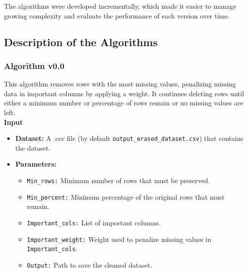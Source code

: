 \documentclass[a4paper,12pt]{article}
\begin{document}
The algorithms were developed incrementally, which made it easier to manage growing complexity and evaluate the performance of each version over time.


\subsection{Description of the Algorithms}
\subsubsection{Algorithm v0.0}
This algorithm removes rows with the most missing values, penalizing missing data in important columns by applying a weight. It continues deleting rows until either a minimum number or percentage of rows remain or no missing values are left.\\
\textbf{Input}
\begin{itemize}
    \item \textbf{Dataset:} A .csv file (by default \texttt{output\_erased\_dataset.csv}) that contains the dataset.
    \item \textbf{Parameters:}
    \begin{itemize}
        \item \texttt{Min\_rows:} Minimum number of rows that must be preserved.
        \item \texttt{Min\_percent:} Minimum percentage of the original rows that must remain.
        \item \texttt{Important\_cols:} List of important columns.
        \item \texttt{Important\_weight:} Weight used to penalize missing values in \texttt{Important\_cols}.
        \item \texttt{Output:} Path to save the cleaned dataset.
    \end{itemize}
\end{itemize}
\end{document}
